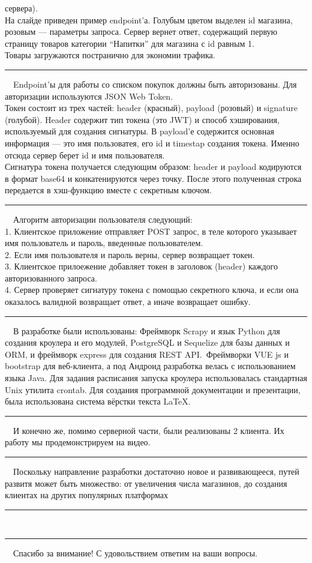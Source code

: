 \documentclass[12pt]{article}
\renewcommand{\line}{\noindent\rule{\textwidth}{1pt}}
\begin{document}
сервера).\\ На слайде приведен пример endpoint'а. Голубым цветом выделен id
магазина, розовым — параметры запроса. Сервер вернет ответ, содержащий первую
страницу товаров категории ``Напитки'' для магазина с id равным 1.\\ Товары
загружаются постранично для экономии трафика.\\
\line\
\max\ Endpoint'ы для работы со списком покупок должны быть авторизованы. Для
авторизации используются JSON Web Token.\\ Токен состоит из трех частей:
header (красный), payload (розовый) и signature (голубой). Header содержит тип
токена (это JWT) и способ хэширования, используемый для создания сигнатуры.  В
payload'е содержится основная информация — это имя пользоватея, его id и
timestap создания токена. Именно отсюда сервер берет id и имя пользователя.\\
Сигнатура токена получается следующим образом: header и payload кодируются в
формат base64 и конкатенируются через точку. После этого полученная строка
передается в хэш-функцию вместе с секретным ключом.\\
\line\
\max\ Алгоритм авторизации пользователя следующий:\\
1. Клиентское приложение отправляет POST запрос, в теле которого указывает имя
пользователь и пароль, введенные пользователем.\\
2. Если имя пользователя и пароль верны, сервер возвращает токен.\\
3. Клиентское прилоежение добавляет токен в заголовок (header) каждого авторизованного запроса.\\
4. Сервер проверяет сигнатуру токена с помощью секретного ключа, и если она
оказалось валидной возвращает ответ, а иначе возвращает ошибку.\\
\line\
\kir\ В разработке были использованы: Фреймворк Scrapy и язык Python для
создания кроулера и его модулей, PostgreSQL и Sequelize для базы данных и ORM,
и фреймворк express для создания REST API.\ Фреймворки VUE js и bootstrap для
веб-клиента, а под Андроид разработка велась с использованием языка Java.  Для
задания расписания запуска кроулера использовалась стандартная Unix утилита
crontab. Для создания программной документации и презентации, была использована
система вёрстки текста {\LaTeX}.\\
\line\
\kir\ И конечно же, помимо серверной части, были реализованы 2 клиента. Их работу мы продемонстрируем на видео.\\
\line\
\kir\ Поскольку направление разработки достаточно новое и развивающееся, путей развитя может быть множество: от увеличения числа магазинов, до создания клиентах на других популярных платформах\\
\line\
\line\
\kir\ Спасибо за внимание! С удовольствием ответим на ваши вопросы.
\end{document}
